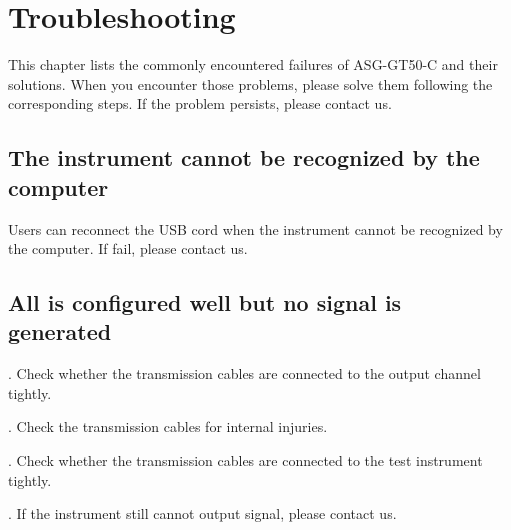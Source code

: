 \chapter{\heiti Troubleshooting}
\hspace{-0.2cm}This chapter lists the commonly encountered failures of ASG-GT50-C and their solutions. When you encounter those problems, please solve them following the corresponding steps. If the problem persists, please contact us.

\section{\heiti The instrument cannot be recognized by the computer}
\hspace{-0.2cm}Users can reconnect the USB cord when the instrument cannot be recognized by the computer. If fail, please contact us. 

\section{\heiti All is configured well but no signal is generated}
. Check whether the transmission cables are connected to the output channel tightly.

. Check the transmission cables for internal injuries.

. Check whether the transmission cables are connected to the test instrument tightly.

. If the instrument still cannot output signal, please contact us.


